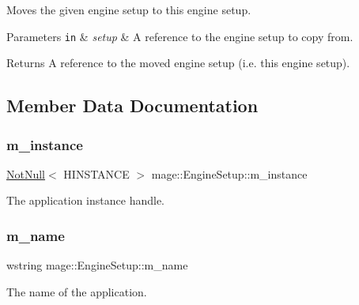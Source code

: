 Moves the given engine setup to this engine setup.


\begin{DoxyParams}[1]{Parameters}
\mbox{\tt in}  & {\em setup} & A reference to the engine setup to copy from. \\
\hline
\end{DoxyParams}
\begin{DoxyReturn}{Returns}
A reference to the moved engine setup (i.\+e. this engine setup). 
\end{DoxyReturn}


\subsection{Member Data Documentation}
\hypertarget{classmage_1_1_engine_setup_a2461909bce6fe90a75528726ceaf46f9}{}\label{classmage_1_1_engine_setup_a2461909bce6fe90a75528726ceaf46f9} 
\subsubsection{\texorpdfstring{m\+\_\+instance}{m\_instance}}
{\footnotesize\ttfamily \hyperlink{namespacemage_a8769f9d670d6b585ea306cb1062af94b}{Not\+Null}$<$ H\+I\+N\+S\+T\+A\+N\+CE $>$ mage\+::\+Engine\+Setup\+::m\+\_\+instance\hspace{0.3cm}{\ttfamily [private]}}

The application instance handle. \hypertarget{classmage_1_1_engine_setup_a3866920e44c0752a89265f9f0c5c5d05}{}\label{classmage_1_1_engine_setup_a3866920e44c0752a89265f9f0c5c5d05} 
\subsubsection{\texorpdfstring{m\+\_\+name}{m\_name}}
{\footnotesize\ttfamily wstring mage\+::\+Engine\+Setup\+::m\+\_\+name\hspace{0.3cm}{\ttfamily [private]}}

The name of the application. 